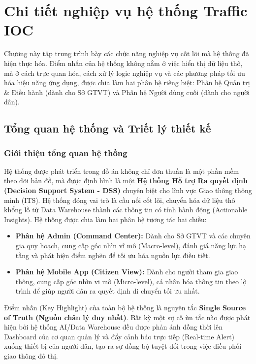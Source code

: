 \section{Chi tiết nghiệp vụ hệ thống Traffic IOC}

Chương này tập trung trình bày các chức năng nghiệp vụ cốt lõi mà hệ thống đã hiện thực hóa. Điểm nhấn của hệ thống không nằm ở việc hiển thị dữ liệu thô, mà ở cách trực quan hóa, cách xử lý logic nghiệp vụ và các phương pháp tối ưu hóa hiệu năng ứng dụng, được chia làm hai phân hệ riêng biệt: Phân hệ Quản trị \& Điều hành (dành cho Sở GTVT) và Phân hệ Người dùng cuối (dành cho người dân).

\subsection{Tổng quan hệ thống và Triết lý thiết kế}

\subsubsection{Giới thiệu tổng quan hệ thống}
Hệ thống được phát triển trong đồ án không chỉ đơn thuần là một phần mềm theo dõi bản đồ, mà được định hình là một \textbf{Hệ thống Hỗ trợ Ra quyết định (Decision Support System - DSS)} chuyên biệt cho lĩnh vực Giao thông thông minh (ITS). 
Hệ thống đóng vai trò là cầu nối cốt lõi, chuyển hóa dữ liệu thô khổng lồ từ Data Warehouse thành các thông tin có tính hành động (Actionable Insights). Hệ thống được chia làm hai phân hệ tương tác hai chiều:
\begin{itemize}
    \item \textbf{Phân hệ Admin (Command Center):} Dành cho Sở GTVT và các chuyên gia quy hoạch, cung cấp góc nhìn vĩ mô (Macro-level), đánh giá năng lực hạ tầng và phát hiện điểm nghẽn để tối ưu hóa nguồn lực điều tiết.
    \item \textbf{Phân hệ Mobile App (Citizen View):} Dành cho người tham gia giao thông, cung cấp góc nhìn vi mô (Micro-level), cá nhân hóa thông tin theo lộ trình để giúp người dân ra quyết định di chuyển tối ưu nhất.
\end{itemize}

Điểm nhấn (Key Highlight) của toàn bộ hệ thống là nguyên tắc \textbf{Single Source of Truth (Nguồn chân lý duy nhất)}. Bất kỳ một sự cố ùn tắc nào được phát hiện bởi hệ thống AI/Data Warehouse đều được phản ánh đồng thời lên Dashboard của cơ quan quản lý và đẩy cảnh báo trực tiếp (Real-time Alert) xuống thiết bị của người dân, tạo ra sự đồng bộ tuyệt đối trong việc điều phối giao thông đô thị.

